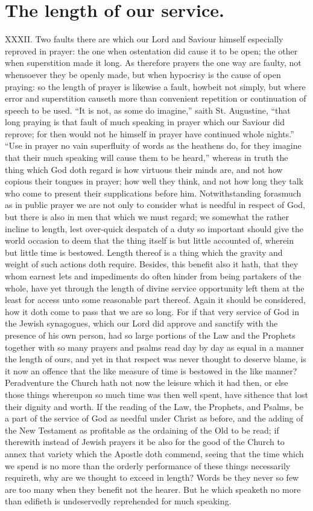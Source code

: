 \section*{The length of our service.}
XXXII. Two faults there are which our Lord and Saviour himself especially reproved in prayer: the one when ostentation did cause it to be open; the other when superstition  made it long. As therefore prayers the one way are faulty, not whensoever they be openly made, but when hypocrisy is the cause of open praying: so the length of prayer is likewise a fault, howbeit not simply, but where error and superstition causeth more than convenient repetition or continuation of speech to be used. “It is not, as some do imagine,” saith St. Augustine, “that long praying is that fault of much speaking in prayer which our Saviour did reprove; for then would not he himself in prayer have continued whole nights.” “Use in prayer no vain superfluity of words as the heathens do, for they imagine that their much speaking will cause them to be heard,” whereas in truth the thing which God doth regard is how virtuous their minds are, and not how copious their tongues in prayer; how well they think, and not how long they talk who come to present their supplications before him.
Notwithstanding forasmuch as in public prayer we are not only to consider what is needful in respect of God, but there is also in men that which we must regard; we somewhat the rather incline to length, lest over-quick despatch of a duty so important should give the world occasion to deem that the thing itself is but little accounted of, wherein but little time is bestowed. Length thereof is a thing which the gravity and weight of such actions doth require.
Besides, this benefit also it hath, that they whom earnest lets and impediments do often hinder from being partakers of the whole, have yet through the length of divine service opportunity left them at the least for access unto some reasonable part thereof.
Again it should be considered, how it doth come to pass  that we are so long. For if that very service of God in the Jewish synagogues, which our Lord did approve and sanctify with the presence of his own person, had so large portions of the Law and the Prophets together with so many prayers and psalms read day by day as equal in a manner the length of ours, and yet in that respect was never thought to deserve blame, is it now an offence that the like measure of time is bestowed in the like manner? Peradventure the Church hath not now the leisure which it had then, or else those things whereupon so much time was then well spent, have sithence that lost their dignity and worth. If the reading of the Law, the Prophets, and Psalms, be a part of the service of God as needful under Christ as before, and the adding of the New Testament as profitable as the ordaining of the Old to be read; if therewith instead of Jewish prayers it be also for the good of the Church to annex that variety which the Apostle doth commend, seeing that the time which we spend is no more than the orderly performance of these things necessarily requireth, why are we thought to exceed in length? Words be they never so few are too many when they benefit not the hearer. But he which speaketh no more than edifieth is undeservedly reprehended for much speaking.
